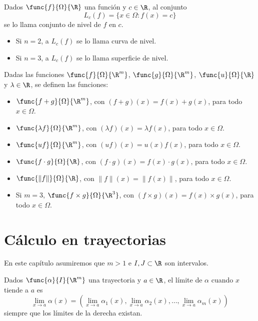 \documentclass[a4,11pt]{aleph-notas}
\begin{document}
\begin{defi}
    Dados $\func{f}{\Omega}{\R}$ una función y $c\in\R$, al conjunto
    \[
        L_c(f)=\{x\in \Omega:f(x)=c\}
    \]
    se lo llama conjunto de nivel de $f$ en $c$.
\end{defi}

\begin{advertencia}
    \begin{itemize}
        \item Si $n=2$, a $L_c(f)$ se lo llama curva de nivel.
        \item Si $n=3$, a $L_c(f)$ se lo llama superficie de nivel.
    \end{itemize}
\end{advertencia}

\begin{defi}
    Dadas las funciones $\func{f}{\Omega}{\R^m}$, $\func{g}{\Omega}{\R^m}$, $\func{u}{\Omega}{\R}$ y $\lambda\in\R$, se definen las funciones:
    \begin{itemize}
        \item $\func{f+g}{\Omega}{\R^m}$, con $(f+g)(x)=f(x)+g(x)$, para todo $x\in \Omega$.
        \item $\func{\lambda f}{\Omega}{\R^m}$, con $(\lambda f)(x)= \lambda f(x)$, para todo $x\in \Omega$.
        \item $\func{u f}{\Omega}{\R^m}$, con $(u f)(x)= u(x) f(x)$, para todo $x\in \Omega$.
        \item $\func{f\cdot g}{\Omega}{\R}$, con $(f\cdot g)(x)=f(x)\cdot g(x)$, para todo $x\in \Omega$.
        \item $\func{\|f\|}{\Omega}{\R}$, con $\|f\|(x)=\|f(x)\|$, para todo $x\in \Omega$.
        \item Si $m=3$, $\func{f\times g}{\Omega}{\R^3}$, con $(f\times g)(x)= f(x)\times g(x)$, para todo $x\in \Omega$.
    \end{itemize}
\end{defi}

\section{Cálculo en trayectorias}

En este capítulo asumiremos que $m>1$ e $I,J\subset\R$ son intervalos.

\begin{defi}[Límite]
    Dados $\func{\alpha}{I}{\R^m}$ una trayectoria y $a\in\R$, el límite de $\alpha$ cuando $x$ tiende a $a$ es
    \[
        \lim_{x\to a}\alpha(x)
        =\left(\lim_{x\to a}\alpha_1(x),\lim_{x\to a}\alpha_2(x),\ldots,\lim_{x\to a}\alpha_m(x)\right)
    \]
    siempre que los límites de la derecha existan.
\end{defi}
\end{document}
